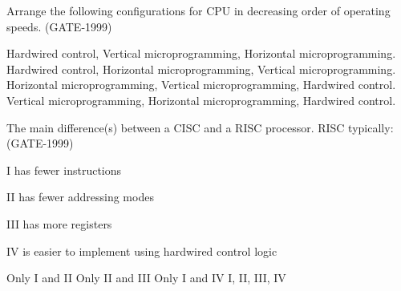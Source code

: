 \begin{questyle}
  \question  Arrange the following configurations for CPU in decreasing order of operating speeds.  (GATE-1999)

  \begin{choices}
    \choice         Hardwired control, Vertical microprogramming, Horizontal microprogramming.
    \CorrectChoice  Hardwired control, Horizontal microprogramming, Vertical microprogramming.
    \choice         Horizontal microprogramming, Vertical microprogramming, Hardwired control.
    \choice         Vertical microprogramming, Horizontal microprogramming, Hardwired control.
  \end{choices}
\end{questyle}


\begin{questyle}
  \question  The main difference(s) between a CISC and a RISC processor. RISC typically:  (GATE-1999)

    \begin{multicols}{2}
        \item[I] has fewer instructions
        \item[II] has fewer addressing modes
        \item[III] has more registers
        \item[IV] is easier to implement using hardwired control logic
    \end{multicols}

  \begin{oneparchoices}
    \choice         Only I and II
    \choice         Only II and III
    \choice         Only I and IV
    \CorrectChoice  I, II, III, IV
  \end{oneparchoices}
\end{questyle}


